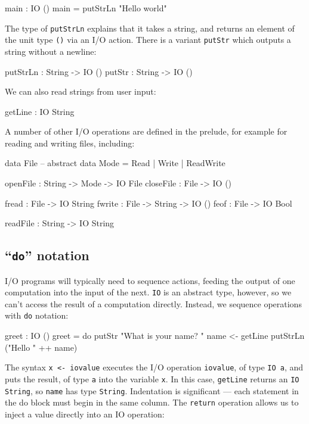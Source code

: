 \begin{code}
main : IO ()
main = putStrLn "Hello world"
\end{code}


\noindent
The type of \texttt{putStrLn} explains that it takes a string, and returns an element of the unit type \texttt{()} via an I/O action.
There is a variant \texttt{putStr} which outputs a string without a newline:

\begin{code}
putStrLn : String -> IO ()
putStr   : String -> IO ()
\end{code}

We can also read strings from user input:

\begin{code}
getLine : IO String
\end{code}


\noindent
A number of other I/O operations are defined in the prelude, for example for reading and writing files, including:

\begin{code}
data File -- abstract
data Mode = Read | Write | ReadWrite

openFile  : String -> Mode -> IO File
closeFile : File -> IO ()

fread  : File -> IO String
fwrite : File -> String -> IO ()
feof   : File -> IO Bool

readFile : String -> IO String
\end{code}


\subsection{``\texttt{do}'' notation}
\label{sect:do}

I/O programs will typically need to sequence actions, feeding the output of one computation into the input of the next.
\texttt{IO} is an abstract type, however, so we can't access the result of a computation directly.
Instead, we sequence operations with \texttt{do} notation:

\begin{code}
greet : IO ()
greet = do putStr "What is your name? "
           name <- getLine
           putStrLn ("Hello " ++ name)
\end{code}


\noindent
The syntax \texttt{x <- iovalue} executes the I/O operation \texttt{iovalue}, of type \texttt{IO a}, and puts the result, of type \texttt{a} into the variable \texttt{x}.
In this case, \texttt{getLine} returns an \texttt{IO String}, so \texttt{name} has type \texttt{String}.
Indentation is significant --- each statement in the do block must begin in the same column.
The \texttt{return} operation allows us to inject a value directly into an IO operation:

